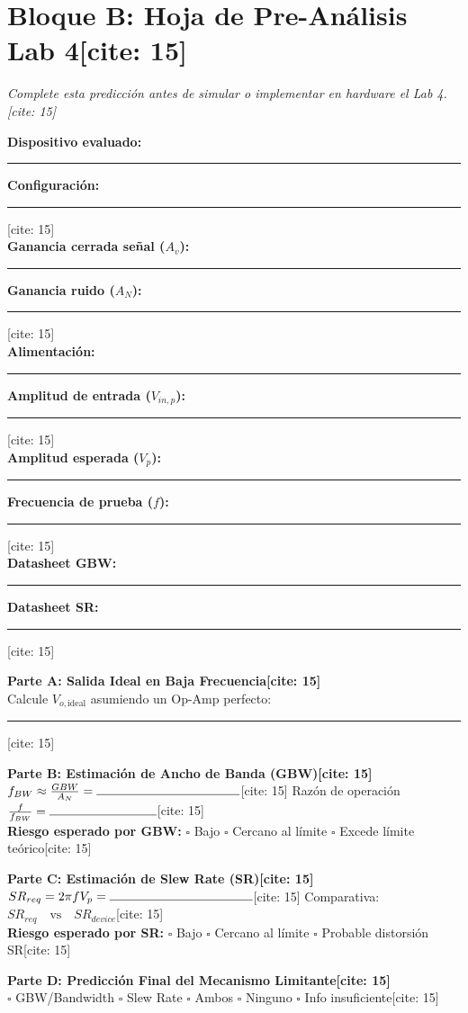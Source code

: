 \documentclass[11pt, a4paper]{article}
\begin{document}
\newpage
\section*{Bloque B: Hoja de Pre-Análisis Lab 4[cite: 15]}
\textit{Complete esta predicción antes de simular o implementar en hardware el Lab 4.[cite: 15]}

\vspace{0.3cm}
\textbf{Dispositivo evaluado:} \rule{5cm}{0.4pt} \textbf{Configuración:} \rule{4cm}{0.4pt}[cite: 15] \\
\textbf{Ganancia cerrada señal ($A_v$):} \rule{3cm}{0.4pt} \textbf{Ganancia ruido ($A_N$):} \rule{3cm}{0.4pt}[cite: 15] \\
\textbf{Alimentación:} \rule{5cm}{0.4pt} \textbf{Amplitud de entrada ($V_{in,p}$):} \rule{2cm}{0.4pt}[cite: 15] \\
\textbf{Amplitud esperada ($V_p$):} \rule{3.2cm}{0.4pt} \textbf{Frecuencia de prueba ($f$):} \rule{2cm}{0.4pt}[cite: 15] \\
\textbf{Datasheet GBW:} \rule{4.5cm}{0.4pt} \textbf{Datasheet SR:} \rule{3.7cm}{0.4pt}[cite: 15]

\vspace{0.4cm}
\textbf{Parte A: Salida Ideal en Baja Frecuencia[cite: 15]} \\
Calcule $V_{o,\mathrm{ideal}}$ asumiendo un Op-Amp perfecto: \rule{6cm}{0.4pt}[cite: 15]

\vspace{0.4cm}
\textbf{Parte B: Estimación de Ancho de Banda (GBW)[cite: 15]} \\
$f_{BW} \approx \frac{GBW}{A_N} = \rule{4cm}{0.4pt}$[cite: 15] \quad Razón de operación $\frac{f}{f_{BW}} = \rule{3cm}{0.4pt}$[cite: 15] \\
\textbf{Riesgo esperado por GBW:} $\square$ Bajo \quad $\square$ Cercano al límite \quad $\square$ Excede límite teórico[cite: 15]

\vspace{0.4cm}
\textbf{Parte C: Estimación de Slew Rate (SR)[cite: 15]} \\
$SR_{req} = 2\pi f V_p = \rule{4cm}{0.4pt}$[cite: 15] \quad Comparativa: $SR_{req} \quad \text{vs} \quad SR_{device}$[cite: 15] \\
\textbf{Riesgo esperado por SR:} $\square$ Bajo \quad $\square$ Cercano al límite \quad $\square$ Probable distorsión SR[cite: 15]

\vspace{0.4cm}
\textbf{Parte D: Predicción Final del Mecanismo Limitante[cite: 15]} \\
$\square$ GBW/Bandwidth \quad $\square$ Slew Rate \quad $\square$ Ambos \quad $\square$ Ninguno \quad $\square$ Info insuficiente[cite: 15]
\end{document}
